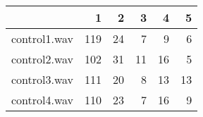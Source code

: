 \begin{tabular}{rrrrrr}
  \hline
 & 1 & 2 & 3 & 4 & 5 \\ 
  \hline
control1.wav & 119 &  24 &   7 &   9 &   6 \\ 
  control2.wav & 102 &  31 &  11 &  16 &   5 \\ 
  control3.wav & 111 &  20 &   8 &  13 &  13 \\ 
  control4.wav & 110 &  23 &   7 &  16 &   9 \\ 
   \hline
\end{tabular}
